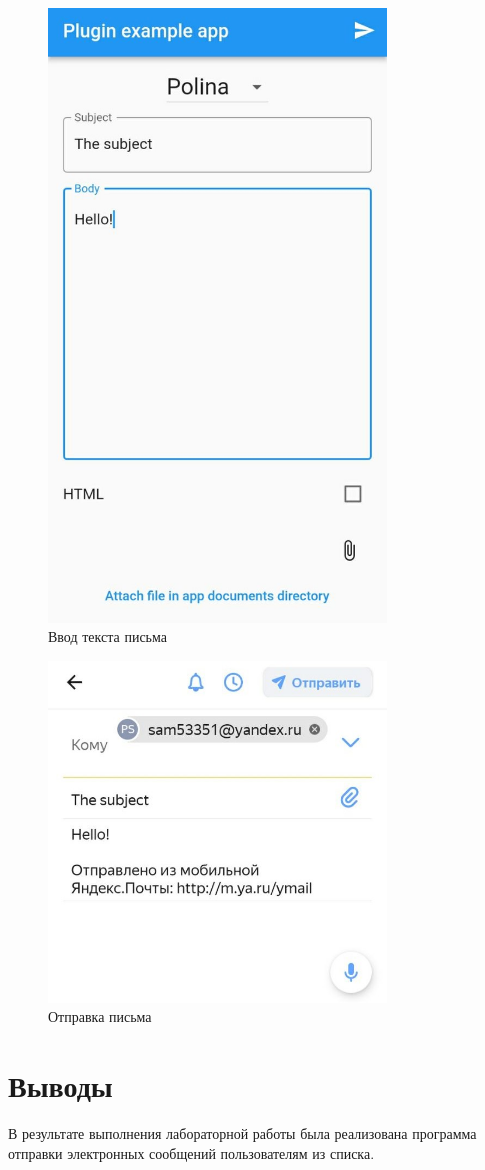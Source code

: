 \documentclass[a4paper, 14pt]{extarticle}
\begin{document}
\begin{figure}[!htb]
	\centering
	\includegraphics[width=0.8\textwidth]{img3}
\caption{Ввод текста письма}
\label{fig:img3}
\end{figure}

\begin{figure}[!htb]
	\centering
	\includegraphics[width=0.8\textwidth]{img4}
\caption{Отправка письма}
\label{fig:img4}
\end{figure}

\section{Выводы}\label{Sect::conclusion}

В результате выполнения лабораторной работы была реализована программа отправки электронных сообщений пользователям из списка.
\end{document}
